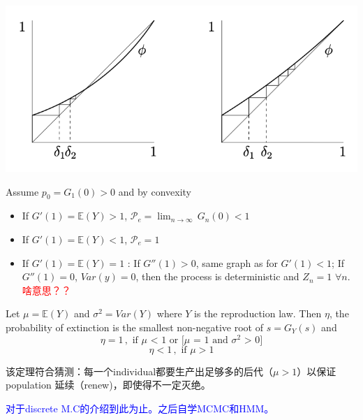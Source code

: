 \documentclass[10.5pt]{article}
\newcommand{\prob}[0]{\mathcal{P}}
\newcommand{\expt}[0]{\mathbb{E}}
\newenvironment{changemargin}[2]{%
  \begin{list}{}{%
    \setlength{\topsep}{0pt}%
    \setlength{\leftmargin}{#1}%
    \setlength{\rightmargin}{#2}%
    \setlength{\listparindent}{\parindent}%
    \setlength{\itemindent}{\parindent}%
    \setlength{\parsep}{\parskip}%
  }%
  \item[]}{\end{list}}
\begin{document}
\begin{changemargin}{-0.125in}{0in}
\begin{enumerate}
            \begin{center}
            	\includegraphics[scale = 0.4]{aaaa}
            \end{center}
            
            
            Assume $p_0 = G_1(0) > 0 $ and by convexity
            \begin{itemize}
            	\item If $G'(1) = \expt(Y) > 1$, $\prob_e = \lim_{n \rightarrow \infty}\,G_n(0)<1$
            	\item If $G'(1) = \expt(Y) < 1$, $\prob_e = 1$
            	\item If $G'(1) = \expt(Y) = 1$ : If $G''(1) > 0$, same graph as for $G'(1) < 1$; If $G''(1) = 0$, $Var(y) = 0$, then the process is deterministic and $Z_n = 1$ $\forall n$. \textcolor{red}{啥意思？？}
            \end{itemize}
            
            \begin{theorem}
            	Let $\mu = \expt(Y)$ and $\sigma^2 = Var(Y)$ where $Y$ is the reproduction law. Then $\eta$, the probability of extinction is the smallest non-negative root of $s = G_Y(s)$ and  
            	\[
            	\eta = 1\,,\,\,\text{if $\mu$ < 1 or [$\mu$ = 1 and $\sigma^2$ > 0]}
               	\]
               	\[
               	\eta < 1\,,\,\,\text{if $\mu > 1$}
               	\]
            \end{theorem}
            
            \begin{remark}
            	该定理符合猜测：每一个individual都要生产出足够多的后代（$\mu > 1$）以保证population 延续（renew)，即使得不一定灭绝。
            \end{remark}
            
            \textcolor{blue}{对于discrete M.C的介绍到此为止。之后自学MCMC和HMM。}
            

\end{enumerate}
\end{changemargin}
\end{document}
